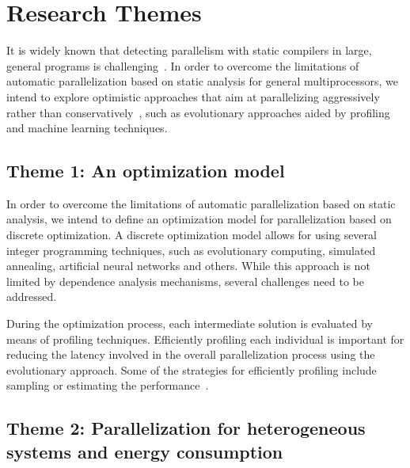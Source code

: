\documentclass[a4paper,12pt]{article}
\newcommand\FIXME[1]{\textcolor{red}{FIX:}\textcolor{red}{#1}}
\begin{document}
\section{Research Themes}\label{sec:research-dir}


It is widely known that detecting parallelism with static compilers in large,
general programs is challenging~\cite{kennedy01,chen03}.  In order to overcome
the limitations of automatic parallelization based on static analysis for
general multiprocessors, we intend to explore optimistic approaches that aim at
parallelizing aggressively rather than
conservatively~\cite{chen03,williams96,williams99}, such as evolutionary
approaches aided by profiling and machine learning techniques. 


\subsection{Theme 1: An optimization model}

In order to overcome the limitations of automatic parallelization based on
static analysis, we intend to define an optimization model for parallelization
based on discrete optimization. A discrete optimization model allows for using
several integer programming techniques, such as evolutionary computing,
simulated annealing, artificial neural networks and others.  While this
approach is not limited by dependence analysis mechanisms, several challenges
need to be addressed.

During the optimization process, each intermediate solution is evaluated by
means of profiling techniques.  Efficiently profiling each individual is
important for reducing the latency involved in the overall parallelization
process using the evolutionary approach.  Some of the strategies for
efficiently profiling include sampling or estimating the
performance~\cite{douskos11,misailovic11,zhu12,fahringer95b,fahringer00,fahringer11}.

\subsection{Theme 2: Parallelization for heterogeneous systems and energy
consumption}
\end{document}
